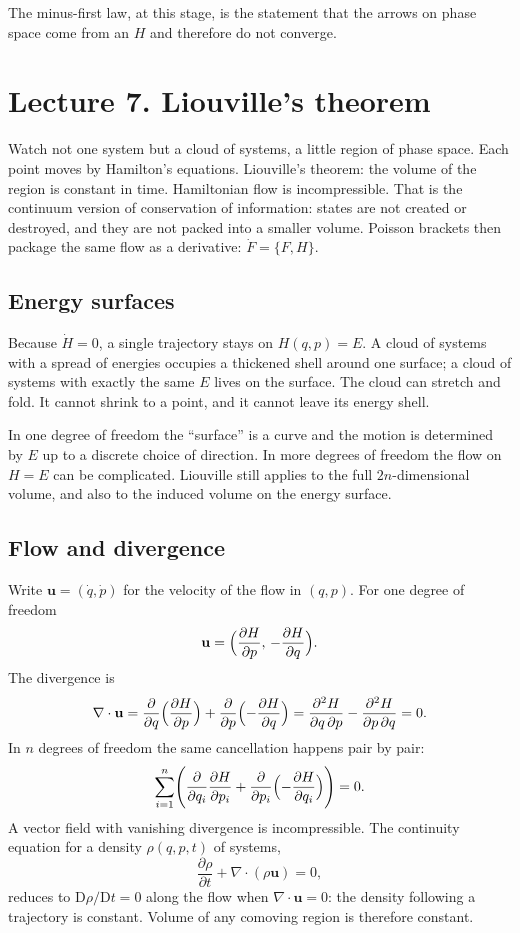 \documentclass[11pt]{article}
\numberwithin{equation}{section}
\newcommand{\qdot}{\dot{q}}
\newcommand{\pdot}{\dot{p}}
\newcommand{\pd}[2]{\frac{\partial #1}{\partial #2}}
\newcommand{\vect}[1]{\mathbf{#1}}
\begin{document}
The minus-first law, at this stage, is the statement that the arrows on phase space come from an $H$ and therefore do not converge.

\section{Lecture 7. Liouville's theorem}

Watch not one system but a cloud of systems, a little region of phase space. Each point moves by Hamilton's equations. Liouville's theorem: the volume of the region is constant in time. Hamiltonian flow is incompressible. That is the continuum version of conservation of information: states are not created or destroyed, and they are not packed into a smaller volume. Poisson brackets then package the same flow as a derivative: $\dot F=\{F,H\}$.

\subsection{Energy surfaces}

Because $\dot H=0$, a single trajectory stays on $H(q,p)=E$. A cloud of systems with a spread of energies occupies a thickened shell around one surface; a cloud of systems with exactly the same $E$ lives on the surface. The cloud can stretch and fold. It cannot shrink to a point, and it cannot leave its energy shell.

In one degree of freedom the ``surface'' is a curve and the motion is determined by $E$ up to a discrete choice of direction. In more degrees of freedom the flow on $H=E$ can be complicated. Liouville still applies to the full $2n$-dimensional volume, and also to the induced volume on the energy surface.

\subsection{Flow and divergence}

Write $\vect{u}=(\qdot,\pdot)$ for the velocity of the flow in $(q,p)$. For one degree of freedom
\[
\vect{u} = \Bigl(\pd{H}{p},\,-\pd{H}{q}\Bigr).
\]
The divergence is
\begin{equation}
\label{eq:divu}
\nabla\cdot\vect{u}
= \pd{}{q}\Bigl(\pd{H}{p}\Bigr) + \pd{}{p}\Bigl(-\pd{H}{q}\Bigr)
= \frac{\partial^2 H}{\partial q\,\partial p} - \frac{\partial^2 H}{\partial p\,\partial q}
= 0.
\end{equation}
In $n$ degrees of freedom the same cancellation happens pair by pair:
\[
\sum_{i=1}^n\Biggl(
\pd{}{q_i}\pd{H}{p_i} + \pd{}{p_i}\Bigl(-\pd{H}{q_i}\Bigr)
\Biggr) = 0.
\]
A vector field with vanishing divergence is incompressible. The continuity equation for a density $\rho(q,p,t)$ of systems,
\[
\pd{\rho}{t} + \nabla\cdot(\rho\vect{u}) = 0,
\]
reduces to $\mathrm{D}\rho/\mathrm{D}t=0$ along the flow when $\nabla\cdot\vect{u}=0$: the density following a trajectory is constant. Volume of any comoving region is therefore constant.
\end{document}
